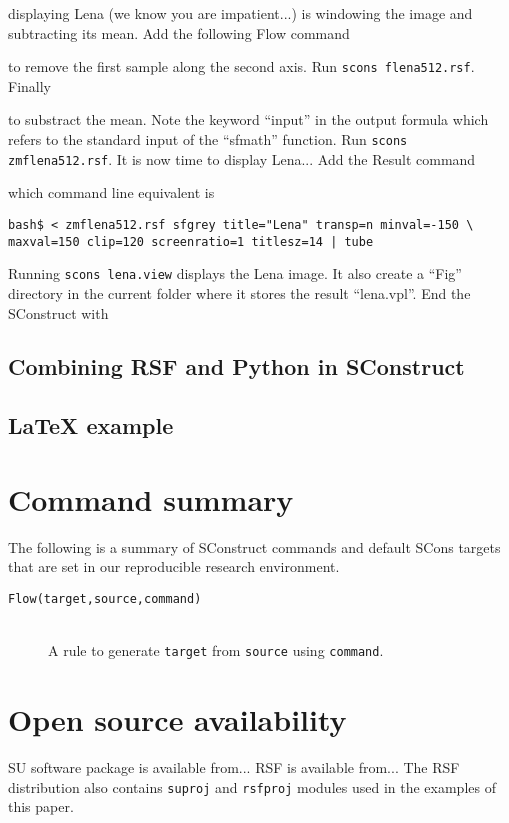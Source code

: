 displaying Lena (we know you are impatient...)  is windowing the image
and subtracting its mean. Add the following Flow command
%

%
to remove the first sample along the second axis. Run \texttt{scons
  flena512.rsf}. Finally
%

%
to substract the mean. Note the keyword ``input'' in the output
formula which refers to the standard input of the ``sfmath'' function.
Run \texttt{scons zmflena512.rsf}. It is now time to display Lena...
Add the Result command
%

%
which command line equivalent is
\begin{verbatim}
bash$ < zmflena512.rsf sfgrey title="Lena" transp=n minval=-150 \
maxval=150 clip=120 screenratio=1 titlesz=14 | tube
\end{verbatim}
%
Running \texttt{scons lena.view} displays the Lena image. It also
create a ``Fig'' directory in the current folder where it stores the
result ``lena.vpl''. End the SConstruct with
%


\subsection{Combining RSF and Python in SConstruct}



\subsection{LaTeX example}

\section{Command summary}

The following is a summary of SConstruct commands and default SCons
targets that are set in our reproducible research environment.

\begin{description}
\item[\texttt{Flow(target,source,command)}] \dotfill \pageref{flow} \\
  A rule to generate \texttt{target} from \texttt{source} using
  \texttt{command}.
\end{description}

\section{Open source availability}

SU software package is available from... RSF is available from... The
RSF distribution also contains \texttt{suproj} and \texttt{rsfproj}
modules used in the examples of this paper.




